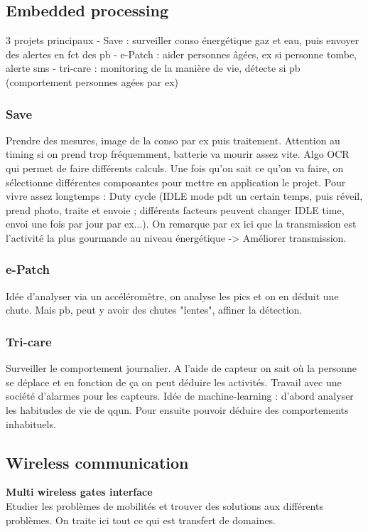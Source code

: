 \documentclass[10pt,a4paper]{article}
\begin{document}
\subsection{Embedded processing}  
3 projets principaux
- Save : surveiller conso énergétique gaz et eau, puis envoyer des alertes en fct des pb
- e-Patch : aider personnes âgées, ex si personne tombe, alerte sms
- tri-care : monitoring de la manière de vie, détecte si pb (comportement personnes agées par ex)
\subsubsection{Save}
Prendre des mesures, image de la conso par ex puis traitement. Attention au timing si on prend trop fréquemment, batterie va mourir assez vite. 
Algo OCR qui permet de faire différents calculs. 
Une fois qu'on sait ce qu'on va faire, on sélectionne différentes composantes pour mettre en application le projet. 
Pour vivre assez longtemps : Duty cycle (IDLE mode pdt un certain temps, puis réveil, prend photo, traite et envoie ; différents facteurs peuvent changer IDLE time, envoi une fois par jour par ex...).
On remarque par ex ici que la transmission est l'activité la plus gourmande au niveau énergétique -> Améliorer transmission. 

\subsubsection{e-Patch}
Idée d'analyser via un accéléromètre, on analyse les pics et on en déduit une chute. Mais pb, peut y avoir des chutes "lentes",  affiner la détection.

\subsubsection{Tri-care}
Surveiller le comportement journalier. A l'aide de capteur on sait où la personne se déplace et en fonction de ça on peut déduire les activités. Travail avec une société d'alarmes pour les capteurs. 
Idée de machine-learning : d'abord analyser les habitudes de vie de qqun. Pour ensuite pouvoir déduire des comportements inhabituels. 

\subsection{Wireless communication}
\textbf{Multi wireless gates interface} \\
Etudier les problèmes de mobilités et trouver des solutions aux différents problèmes. On traite ici tout ce qui est transfert de domaines. 
\end{document}
